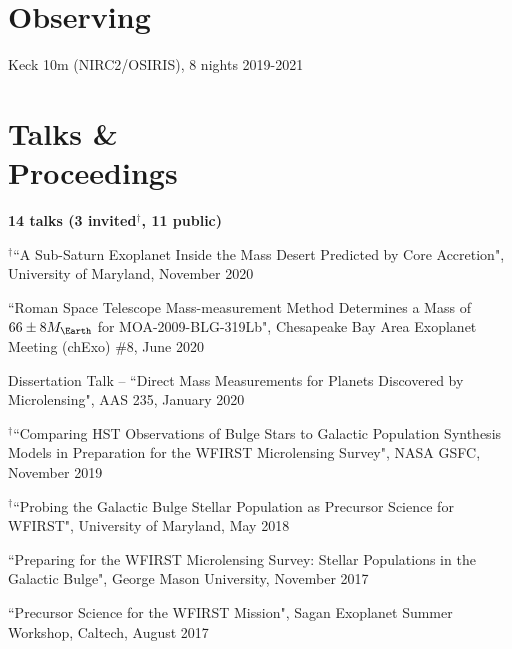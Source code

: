 \documentclass[margin,line]{res}
\begin{document}
\begin{resume}
\section{\sc Observing}
Keck 10m (NIRC2/OSIRIS), 8 nights \hfill 2019-2021

\section{\sc Talks \&\\ Proceedings}
\textbf{14 talks (3 invited$^{\dagger}$, 11 public)}\\
\begin{etaremune}
\item $^{\dagger}$``A Sub-Saturn Exoplanet Inside the Mass Desert Predicted by Core Accretion", University of Maryland, November 2020
\item ``Roman Space Telescope Mass-measurement Method Determines a Mass of $66 \pm 8M_{\Earth}$ for MOA-2009-BLG-319Lb", Chesapeake Bay Area Exoplanet Meeting (chExo) \#8, June 2020

\item Dissertation Talk -- ``Direct Mass Measurements for Planets Discovered by Microlensing", AAS 235, January 2020

\item $^{\dagger}$``Comparing HST Observations of Bulge Stars to Galactic Population Synthesis Models in Preparation for the WFIRST Microlensing Survey", NASA GSFC, November 2019 
\item $^{\dagger}$``Probing the Galactic Bulge Stellar Population as Precursor Science for WFIRST", University of Maryland, May 2018

\item ``Preparing for the WFIRST Microlensing Survey: Stellar Populations in the Galactic Bulge", George Mason University, November 2017

\item ``Precursor Science for the WFIRST Mission", Sagan Exoplanet Summer Workshop, Caltech, August 2017


\end{etaremune}
\end{resume}
\end{document}
